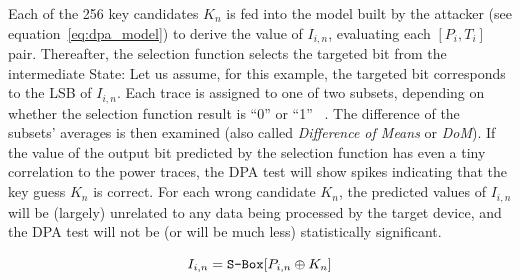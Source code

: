             Each of the 256 key candidates $K_n$ is fed into the model built by the attacker (see equation~\ref{eq:dpa_model}) to derive the value of $I_{i,n}$, evaluating each $[P_i, T_i]$ pair. Thereafter, the selection function selects the targeted bit from the intermediate State: Let us assume, for this example, the targeted bit corresponds to the LSB of $I_{i,n}$. Each trace is assigned to one of two subsets, depending on whether the selection function result is ``0'' or ``1'' ~\cite{kocher2011introduction}. The difference of the subsets’ averages is then examined (also called \emph{Difference of Means} or \emph{DoM}). If the value of the \sbocs{} output bit predicted by the selection function has even a tiny correlation to the power traces, the DPA test will show spikes indicating that the key guess $K_n$ is correct. For each wrong candidate $K_n$, the predicted values of $I_{i,n}$ will be (largely) unrelated to any data being processed by the target device, and the DPA test will not be (or will be much less) statistically significant.

            \begin{equation}\label{eq:dpa_model}
                I_{i,n} = \texttt{S-Box}{}[P_{i,n} \oplus K_{n}]
            \end{equation}
            
            


